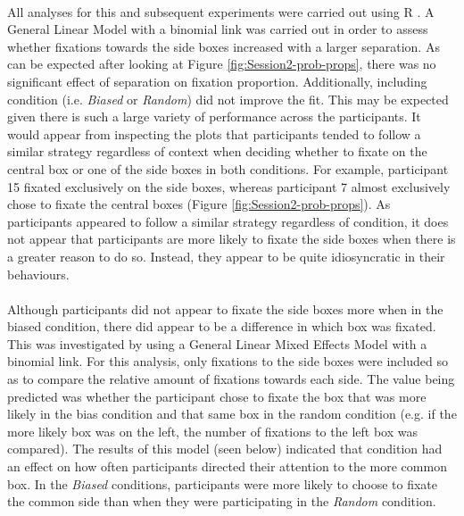 \documentclass[12pt]{article}
\begin{document}
\paragraph{} All analyses for this and subsequent experiments were carried out using R \citep{R}. A General Linear Model with a binomial link was carried out in order to assess whether fixations towards the side boxes increased with a larger separation. As can be expected after looking at Figure \ref{fig:Session2-prob-props}, there was no significant effect of separation on fixation proportion. Additionally, including condition (i.e. \textit{Biased} or \textit{Random}) did not improve the fit. This may be expected given there is such a large variety of performance across the participants. It would appear from inspecting the plots that participants tended to follow a similar strategy regardless of context when deciding whether to fixate on the central box or one of the side boxes in both conditions. For example, participant 15  fixated exclusively on the side boxes, whereas participant 7 almost exclusively chose to fixate the central boxes (Figure \ref{fig:Session2-prob-props}). As participants appeared to follow a similar strategy regardless of condition, it does not appear that participants are more likely to fixate the side boxes when there is a greater reason to do so. Instead, they appear to be quite idiosyncratic in their behaviours. 

\paragraph{} Although participants did not appear to fixate the side boxes more when in the biased condition, there did appear to be a difference in which box was fixated. This was investigated by using a General Linear Mixed Effects Model with a binomial link. For this analysis, only fixations to the side boxes were included so as to compare the relative amount of fixations towards each side. The value being predicted was whether the participant chose to fixate the box that was more likely in the bias condition and that same box in the random condition (e.g. if the more likely box was on the left, the number of fixations to the left box was compared). The results of this model (seen below) indicated that condition had an effect on how often participants directed their attention to the more common box. In the \textit{Biased} conditions, participants were more likely to choose to fixate the common side than when they were participating in the \textit{Random} condition.
\end{document}
